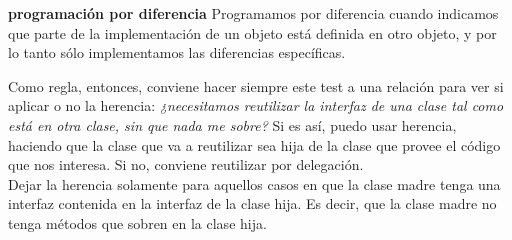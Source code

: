 \documentclass[../main.tex]{subfiles}
\begin{document}
        \begin{definition} \textbf{programación por diferencia} 
            Programamos por diferencia cuando indicamos que parte de la implementación de un objeto está definida en otro objeto, y por lo tanto sólo implementamos las diferencias específicas.
        \end{definition}

        Como regla, entonces, conviene hacer siempre este test a una relación para ver si aplicar o no la herencia: \textit{¿necesitamos reutilizar la interfaz de una clase tal como está en otra clase, sin que nada me sobre?} Si es así, puedo usar herencia, haciendo que la clase que va a reutilizar sea hija de la clase que provee el código que nos interesa. Si no, conviene reutilizar por delegación.\\

        Dejar la herencia solamente para aquellos casos en que la clase madre tenga una interfaz contenida en la interfaz de la clase hija. Es decir, que la clase madre no tenga métodos que sobren en la clase hija.
\end{document}
